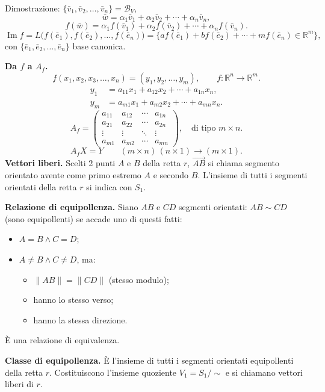 \documentclass[11pt,a4paper]{article}
\newcommand{\pagina}[1]{\clearpage}
\begin{document}
Dimostrazione: $\{\bar v_1,\bar v_2,\ldots,\bar v_n\}=\mathcal B_V$,
\[\bar w=\alpha_1\bar v_1+\alpha_2\bar v_2+\cdots+\alpha_n\bar v_n,\]
\[f(\bar w)=\alpha_1f(\bar v_1)+\alpha_2f(\bar v_2)+\cdots+\alpha_nf(\bar v_n).\]
\[\operatorname{Im}f=L\bigl(f(\bar e_1),f(\bar e_2),\ldots,f(\bar e_n)\bigr)
=\{af(\bar e_1)+bf(\bar e_2)+\cdots+mf(\bar e_n)\in\mathbb R^m\},\]
con $\{\bar e_1,\bar e_2,\ldots,\bar e_n\}$ base canonica.

\textbf{Da $f$ a $A_f$.}
\[f(x_1,x_2,x_3,\ldots,x_n)=(y_1,y_2,\ldots,y_m),\qquad f:\mathbb R^n\to\mathbb R^m.\]
\pagina{43}
\[\begin{aligned}y_1&=a_{11}x_1+a_{12}x_2+\cdots+a_{1n}x_n,\\y_m&=a_{m1}x_1+a_{m2}x_2+\cdots+a_{mn}x_n.\end{aligned}\]
\[A_f=\begin{pmatrix}a_{11}&a_{12}&\cdots&a_{1n}\\a_{21}&a_{22}&\cdots&a_{2n}\\\vdots&\vdots&\ddots&\vdots\\a_{m1}&a_{m2}&\cdots&a_{mn}\end{pmatrix},\quad\text{di tipo }m\times n.\]
\[A_fX=Y\qquad(m\times n)\,(n\times1)\longrightarrow(m\times1).\]
\textbf{Vettori liberi.} Scelti 2 punti $A$ e $B$ della retta $r$, $\overrightarrow{AB}$ si chiama segmento orientato avente come primo estremo $A$ e secondo $B$. L'insieme di tutti i segmenti orientati della retta $r$ si indica con $S_1$.

\textbf{Relazione di equipollenza.} Siano $AB$ e $CD$ segmenti orientati: $AB\sim CD$ (sono equipollenti) se accade uno di questi fatti:
\begin{itemize}\item $A=B\land C=D$;
\item $A\ne B\land C\ne D$, ma:
\begin{itemize}\item $\|AB\|=\|CD\|$ (stesso modulo);
\item hanno lo stesso verso;
\item hanno la stessa direzione.\end{itemize}\end{itemize}
È una relazione di equivalenza.

\pagina{44}
\textbf{Classe di equipollenza.} È l'insieme di tutti i segmenti orientati equipollenti della retta $r$. Costituiscono l'insieme quoziente $V_1=S_1/{\sim}$ e si chiamano vettori liberi di $r$.
\end{document}
